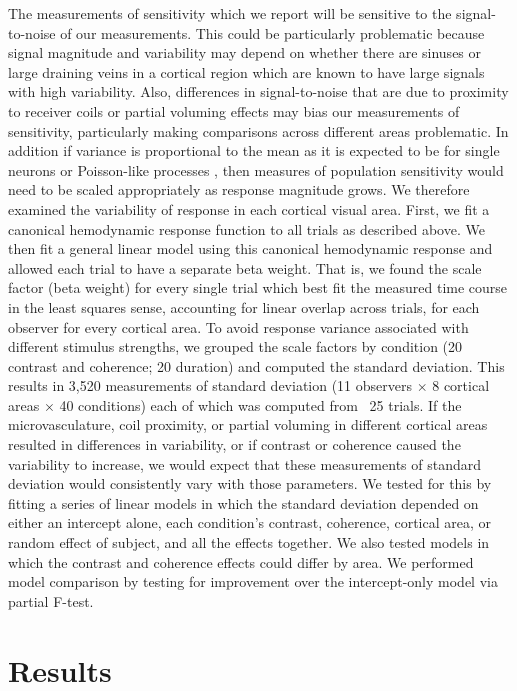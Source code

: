 \documentclass{report}
\begin{document}
The measurements of sensitivity which we report will be sensitive to the signal-to-noise of our measurements. This could be particularly problematic because signal magnitude and variability may depend on whether there are sinuses or large draining veins in a cortical region which are known to have large signals with high variability. Also, differences in signal-to-noise that are due to proximity to receiver coils or partial voluming effects may bias our measurements of sensitivity, particularly making comparisons across different areas problematic. In addition if variance is proportional to the mean as it is expected to be for single neurons or Poisson-like processes \citep{Softky1993-ki}, then measures of population sensitivity would need to be scaled appropriately as response magnitude grows. We therefore examined the variability of response in each cortical visual area. First, we fit a canonical hemodynamic response function to all trials as described above. We then fit a general linear model using this canonical hemodynamic response and allowed each trial to have a separate beta weight. That is, we found the scale factor (beta weight) for every single trial which best fit the measured time course in the least squares sense, accounting for linear overlap across trials, for each observer for every cortical area. To avoid response variance associated with different stimulus strengths, we grouped the scale factors by condition (20 contrast and coherence; 20 duration) and computed the standard deviation. This results in 3,520 measurements of standard deviation (11 observers $\times$ 8 cortical areas $\times$ 40 conditions) each of which was computed from ~25 trials. If the microvasculature, coil proximity, or partial voluming in different cortical areas resulted in differences in variability, or if contrast or coherence caused the variability to increase, we would expect that these measurements of standard deviation would consistently vary with those parameters. We tested for this by fitting a series of linear models in which the standard deviation depended on either an intercept alone, each condition’s contrast, coherence, cortical area, or random effect of subject, and all the effects together. We also tested models in which the contrast and coherence effects could differ by area. We performed model comparison by testing for improvement over the intercept-only model via partial F-test.


\section{Results}
\end{document}
